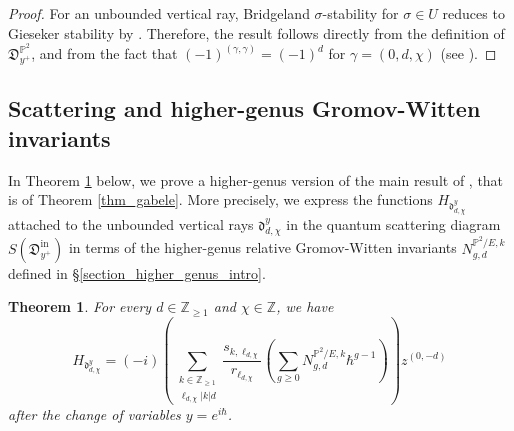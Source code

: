 \documentclass[11pt,letterpaper]{amsart}
\newtheorem{thm}[defn]{Theorem}
\newcommand\PP{\mathbb P}
\newcommand\Z{\mathbb Z}
\newcommand\fd{\mathfrak d}
\newcommand\fD{\mathfrak D}
\newcommand\iin{\mathrm{in}}
\begin{document}
\begin{proof}
For an unbounded vertical ray, Bridgeland $\sigma$-stability 
for $\sigma \in U$ reduces to Gieseker stability by 
\cite[Lemma 6.1.1]{bousseau2019scattering}.
Therefore, the result follows directly from
the definition 
\cite[Definition 2.5.7]{bousseau2019scattering} of $\fD^{\PP^2}_{y^+}$, 
and from the fact that $(-1)^{(\gamma,\gamma)}=(-1)^{d}$ for 
$\gamma=(0,d,\chi)$ (see \cite[Definition 2.1.1]{bousseau2019scattering}).

\end{proof}



\subsection{Scattering and higher-genus Gromov-Witten invariants}
\label{section_vertical_gw_refined}



In Theorem \ref{thm_gabele_refined} below, we prove a higher-genus version of the main result of  
\cite{gabele2019tropical}, that is of
Theorem \ref{thm_gabele}. 
More precisely, we express the functions $H_{\fd_{d,\chi}^y}$ attached to the unbounded vertical rays 
$\fd_{d,\chi}^y$ in the quantum scattering diagram $S(\fD^\iin_{y^+})$ in terms of the
higher-genus relative Gromov-Witten invariants $N_{g,d}^{\PP^2/E,k}$ defined in \S \ref{section_higher_genus_intro}.


\begin{thm}\label{thm_gabele_refined}
For every 
$d \in \Z_{\geqslant 1}$ and $\chi \in \Z$, we have 
\[ H_{\fd_{d,\chi}^y}
=(-i)\left( 
\sum_{\substack{k\in \Z_{\geqslant 1}\\
\ell_{d,\chi}|k|d}}
\frac{s_{k,\ell_{d,\chi}}}{r_{\ell_{d,\chi}}}
\left(
\sum_{g \geqslant 0} N_{g,d}^{\PP^2/E,k}
\hbar^{g-1}
\right)
\right)z^{(0,-d)} \]
after the change of variables $y=e^{i\hbar}$.
\end{thm}
\end{document}
